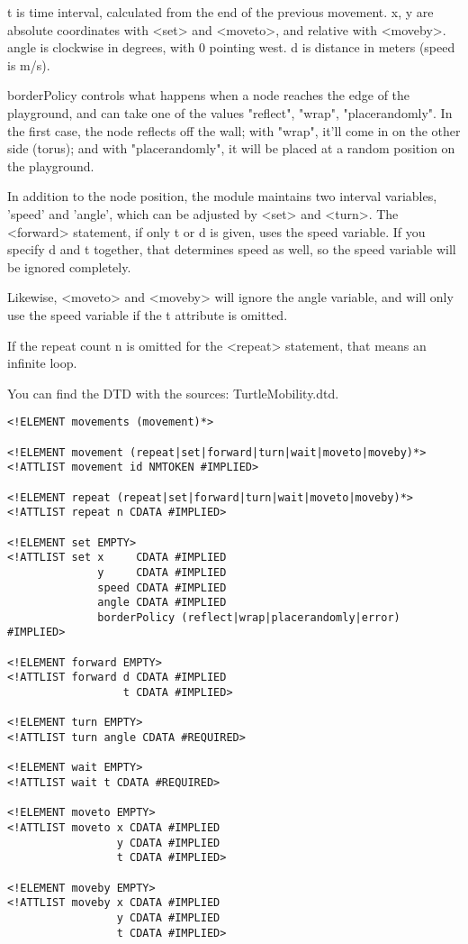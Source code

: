 t is time interval, calculated from the end of the previous movement.
x, y are absolute coordinates with <set> and <moveto>, and relative
with <moveby>. angle is clockwise in degrees, with 0 pointing west.
d is distance in meters (speed is m/s).

borderPolicy controls what happens when a node reaches the edge of the
playground, and can take one of the values "reflect", "wrap",
"placerandomly". In the first case, the node reflects off the wall;
with "wrap", it'll come in on the other side (torus); and with
"placerandomly", it will be placed at a random position on the
playground.

In addition to the node position, the module maintains two interval variables,
'speed' and 'angle', which can be adjusted by <set> and <turn>.
The <forward> statement, if only t or d is given, uses the speed variable.
If you specify d and t together, that determines speed as well,
so the speed variable will be ignored completely.

Likewise, <moveto> and <moveby> will ignore the angle variable,
and will only use the speed variable if the t attribute is omitted.

If the repeat count n is omitted for the <repeat> statement, that
means an infinite loop.



You can find the DTD with the sources: TurtleMobility.dtd.

\begin{verbatim}
<!ELEMENT movements (movement)*>

<!ELEMENT movement (repeat|set|forward|turn|wait|moveto|moveby)*>
<!ATTLIST movement id NMTOKEN #IMPLIED>

<!ELEMENT repeat (repeat|set|forward|turn|wait|moveto|moveby)*>
<!ATTLIST repeat n CDATA #IMPLIED>

<!ELEMENT set EMPTY>
<!ATTLIST set x     CDATA #IMPLIED
              y     CDATA #IMPLIED
              speed CDATA #IMPLIED
              angle CDATA #IMPLIED
              borderPolicy (reflect|wrap|placerandomly|error) #IMPLIED>

<!ELEMENT forward EMPTY>
<!ATTLIST forward d CDATA #IMPLIED
                  t CDATA #IMPLIED>

<!ELEMENT turn EMPTY>
<!ATTLIST turn angle CDATA #REQUIRED>

<!ELEMENT wait EMPTY>
<!ATTLIST wait t CDATA #REQUIRED>

<!ELEMENT moveto EMPTY>
<!ATTLIST moveto x CDATA #IMPLIED
                 y CDATA #IMPLIED
                 t CDATA #IMPLIED>

<!ELEMENT moveby EMPTY>
<!ATTLIST moveby x CDATA #IMPLIED
                 y CDATA #IMPLIED
                 t CDATA #IMPLIED>
\end{verbatim}

